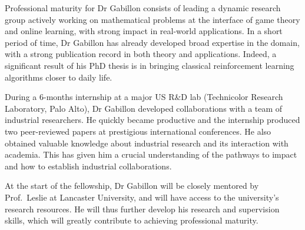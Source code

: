 Professional maturity for Dr Gabillon consists of leading a dynamic research group actively working on mathematical problems at the interface of game theory and online learning, with strong impact in real-world applications. In a short period of time, Dr Gabillon has already developed broad expertise in the domain, with a strong publication record in both theory and applications. Indeed, a significant result of his PhD thesis is in bringing classical reinforcement learning algorithms closer to daily life.

During  a 6-months internship at a major US R\&D lab (Technicolor Research Laboratory, Palo Alto), Dr Gabillon developed collaborations with a team of industrial researchers. He quickly became productive and the internship produced two peer-reviewed papers at prestigious international conferences. He also obtained valuable knowledge about industrial research and its interaction with academia. This has given him a crucial understanding of the pathways to impact and how to establish industrial collaborations.

At the start of the fellowship, Dr Gabillon will be closely mentored by Prof.\ Leslie at Lancaster University, and will have access to the university's research resources. He will thus further develop his research and supervision skills, which will greatly contribute to achieving professional maturity.%